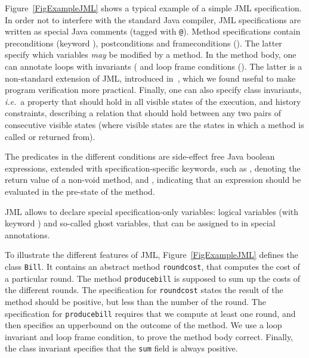 Figure~\ref{FigExampleJML} shows a typical example of a simple JML
specification.  In order not to interfere with the standard Java
compiler, JML specifications are written as special Java comments
(tagged with \texttt{@}). Method specifications contain preconditions
(keyword ), postconditions  and
frameconditions (). The latter specify which
variables \emph{may} be modified by a method. In the method body, one
can annotate loops with invariants ( and loop
frame conditions (). The latter is a
non-standard extension of JML, introduced in~\cite{BurdyRL03}, which we
found useful to make program verification more practical. Finally, one
can also specify class invariants, \emph{i.e.}\ a property that should
hold in all visible states of the execution, and history constraints,
describing a relation that should hold between any two pairs of
consecutive visible states (where visible states are the states in
which a method is called or returned from). 

The predicates in the different conditions are side-effect free Java
boolean expressions, extended with specification-specific keywords,
such as , denoting the return value of a non-void
method, and , indicating that an expression should be
evaluated in the pre-state of the method.

JML allows to declare special specification-only variables: logical
variables (with keyword ) and so-called ghost variables,
that can be assigned to in special  annotations.

To illustrate the different features of JML, Figure~\ref{FigExampleJML}
defines the class \texttt{Bill}. It contains an abstract method
\texttt{round\unsc cost}, that computes the cost of a particular
round. The method \texttt{produce\unsc bill} is supposed to sum up the
costs of the different rounds. The specification for
\texttt{round\unsc cost} states the result of the method should be
positive, but less than the number of the round. The specification for
\texttt{produce\unsc bill} requires that we compute at least one
round, and then specifies an upperbound on the outcome of the
method. We use a loop invariant and loop frame condition, to prove the
method body correct. Finally, the class invariant specifies that the
\texttt{sum} field is always positive.
     



